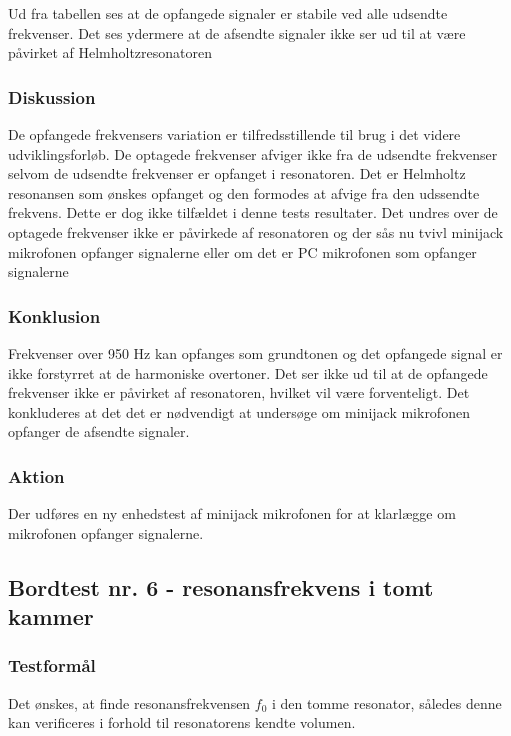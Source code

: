 {\begin{table}[]
\begin{tabular}{lll}
				\end{tabular}
			\end{table}
			
			Ud fra tabellen ses at de opfangede signaler er stabile ved alle udsendte frekvenser. Det ses ydermere at de afsendte signaler ikke ser ud til at være påvirket af Helmholtzresonatoren
				
			  
			\subsubsection{Diskussion}
			De opfangede frekvensers variation er tilfredsstillende til brug i det videre udviklingsforløb. De optagede frekvenser afviger ikke fra de udsendte frekvenser selvom de udsendte frekvenser er opfanget i resonatoren. Det er Helmholtz resonansen som ønskes opfanget og den formodes at afvige fra den udssendte frekvens. Dette er dog ikke tilfældet i denne tests resultater. Det undres over de optagede frekvenser ikke er påvirkede af resonatoren og der sås nu tvivl minijack mikrofonen opfanger signalerne eller om det er PC mikrofonen som opfanger signalerne
			
			\subsubsection{Konklusion}
			Frekvenser over 950 Hz kan opfanges som grundtonen og det opfangede signal er ikke forstyrret at de harmoniske overtoner. Det ser ikke ud til at de opfangede frekvenser ikke er påvirket af resonatoren, hvilket vil være forventeligt. Det konkluderes at det det er nødvendigt at undersøge om minijack mikrofonen opfanger de afsendte signaler. 
			
			\subsubsection{Aktion}
			 Der udføres en ny enhedstest af minijack mikrofonen for at klarlægge om mikrofonen opfanger signalerne. 
			 
 	\subsection{Bordtest nr. 6 - resonansfrekvens i tomt kammer}
	
	\subsubsection{Testformål}
	Det ønskes, at finde resonansfrekvensen $f_{0}$ i den tomme resonator, således denne kan verificeres i forhold til resonatorens kendte volumen.  	
	
}
